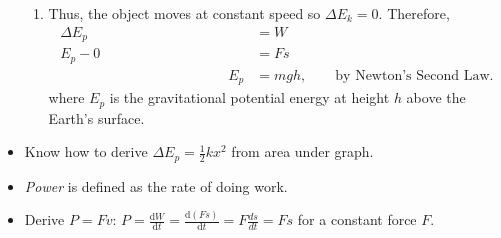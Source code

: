 \documentclass[oneside]{book}
\begin{document}
\begin{itemize}
\begin{enumerate}
        \item Thus, the object moves at constant speed so \(\Delta E_k=0\). Therefore, 
        \begin{align*}
            \Delta E_p&= W\\
            E_p-0&=Fs\\
            \qquad\qquad\qquad\qquad\qquad\qquad
            E_p&=mgh, \qquad\text{by Newton's Second Law.}
        \end{align*}
        where \(E_p\) is the gravitational potential energy at height \(h\) above the Earth's surface.
    \end{enumerate}
    \item Know how to derive \(\Delta E_p=\frac{1}{2}kx^2\) from area under graph.
    \item \emph{Power} is defined as the rate of doing work.
    \item Derive \(P=Fv\): \(P=\frac{\text{d}W}{\text{d}t}=\frac{\text{d}(Fs)}{\text{d}t}=F\frac{ds}{dt}=Fs\) for a constant force \(F\).
\end{itemize}
\end{document}
